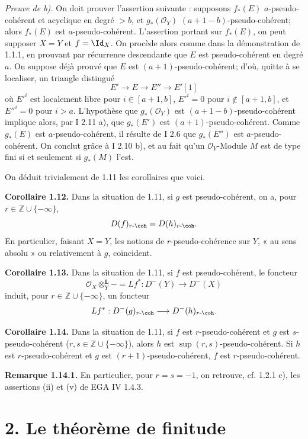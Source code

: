 \documentclass[11pt]{article}
\begin{document}
\emph{Preuve de b).} On doit prouver l'assertion suivante : supposons \(f_*(E)\) \(a\)-pseudo-cohérent et acyclique en degré \(>b\), et \(g_*(\mathcal O_Y)\) \((a+1-b)\)-pseudo-cohérent; alors \(f_*(E)\) est \(a\)-pseudo-cohérent. L'assertion portant sur \(f_*(E)\), on peut supposer \(X=Y\) et \(f=\Id_X\). On procède alors comme dans la démonstration de 1.1.1, en prouvant par récurrence descendante que \(E\) est pseudo-cohérent en degré \(a\). On suppose déjà prouvé que \(E\) est \((a+1)\)-pseudo-cohérent; d'où, quitte à se localiser, un triangle distingué
\[
E'\longrightarrow E\longrightarrow E''\longrightarrow E'[1]
\]
où \(E'^i\) est localement libre pour \(i\in[a+1,b]\), \(E'^i=0\) pour \(i\notin[a+1,b]\), et \(E''^i=0\) pour \(i>a\). L'hypothèse que \(g_*(\mathcal O_Y)\) est \((a+1-b)\)-pseudo-cohérent implique alors, par I 2.11 a), que \(g_*(E')\) est \((a+1)\)-pseudo-cohérent. Comme \(g_*(E)\) est \(a\)-pseudo-cohérent, il résulte de I 2.6 que \(g_*(E'')\) est \(a\)-pseudo-cohérent. On conclut grâce à I 2.10 b), et au fait qu'un \(\mathcal O_Y\)-Module \(M\) est de type fini si et seulement si \(g_*(M)\) l'est.

On déduit trivialement de 1.11 les corollaires que voici.

\textbf{Corollaire 1.12.} Dans la situation de 1.11, si \(g\) est pseudo-cohérent, on a, pour \(r\in\mathbb Z\cup\{-\infty\}\),
\[
  D(f)_{r\text{-}\coh}=D(h)_{r\text{-}\coh}.
\]
En particulier, faisant \(X=Y\), les notions de \(r\)-pseudo-cohérence sur \(Y\), « au sens absolu » ou relativement à \(g\), coïncident.

\textbf{Corollaire 1.13.} Dans la situation de 1.11, si \(f\) est pseudo-cohérent, le foncteur
\[
  \mathcal O_X\otimes_Y^{\mathbf L}-=Lf^*:D^{-}(Y)\longrightarrow D^{-}(X)
\]
induit, pour \(r\in\mathbb Z\cup\{-\infty\}\), un foncteur
\[
  Lf^*:D^{-}(g)_{r\text{-}\coh}\longrightarrow D^{-}(h)_{r\text{-}\coh}.
\]

\textbf{Corollaire 1.14.} Dans la situation de 1.11, si \(f\) est \(r\)-pseudo-cohérent et \(g\) est \(s\)-pseudo-cohérent (\(r,s\in\mathbb Z\cup\{-\infty\}\)), alors \(h\) est \(\sup(r,s)\)-pseudo-cohérent. Si \(h\) est \(r\)-pseudo-cohérent et \(g\) est \((r+1)\)-pseudo-cohérent, \(f\) est \(r\)-pseudo-cohérent.

\textbf{Remarque 1.14.1.} En particulier, pour \(r=s=-1\), on retrouve, cf. 1.2.1 c), les assertions (ii) et (v) de EGA IV 1.4.3.

\section*{2. Le théorème de finitude}
\end{document}
